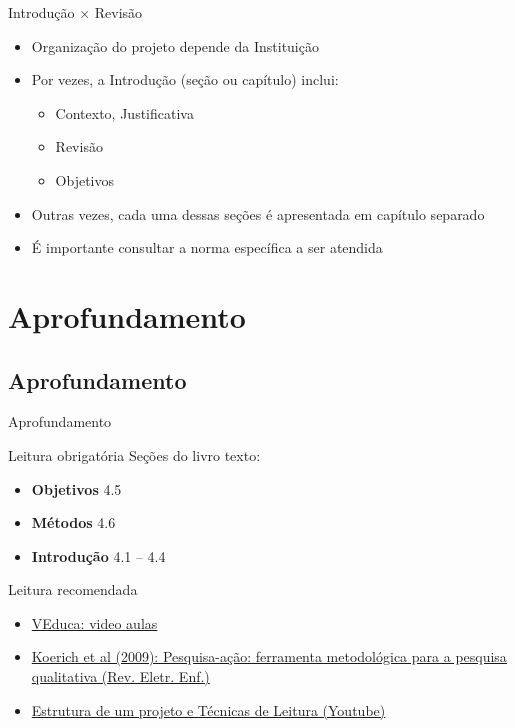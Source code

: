 \documentclass{beamer}
\begin{document}
\begin{frame}{Introdução $\times$ Revisão}
  \begin{itemize}
    \footnotesize
  \item Organização do projeto depende da Instituição
  \bigskip
  \item Por vezes, a Introdução (seção ou capítulo) inclui:
    \begin{itemize}
      \scriptsize
    \item Contexto, Justificativa
    \item Revisão
    \item Objetivos
    \end{itemize}
  \bigskip
  \item Outras vezes, cada uma dessas seções é apresentada em capítulo
    separado
  \bigskip
  \item É importante \alert{consultar} a norma \alert{específica} a
    ser atendida
  \end{itemize}
\end{frame}

\section{Aprofundamento}

\subsection{Aprofundamento}

\begin{frame}{Aprofundamento}
  \begin{block}{Leitura obrigatória}
    \scriptsize
    Seções do livro texto:
    \begin{itemize}
      \scriptsize
    \item {\bf Objetivos} 4.5
    \item {\bf Métodos} 4.6
    \item {\bf Introdução} 4.1 -- 4.4
    \end{itemize}
  \end{block}
  \begin{block}{Leitura recomendada}
    \begin{itemize}
      \scriptsize
    \item<1-> \href{http://www.veduca.com.br/assistir/metodologia-cientifica}
      {VEduca: video aulas}
    \item<1-> \href{http://www.veduca.com.br/assistir/metodologia-cientifica}
      {Koerich et al (2009): Pesquisa-ação: ferramenta
      metodológica para a pesquisa qualitativa (Rev. Eletr. Enf.)}
  \item<1-> \href{http://www.veduca.com.br/assistir/metodologia-cientifica}
    {Estrutura de um projeto e Técnicas de Leitura (Youtube)}
    \end{itemize}
  \end{block}
\end{frame}
\end{document}
